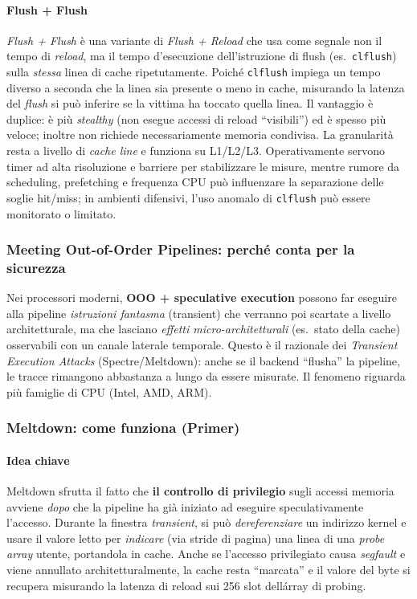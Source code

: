 \paragraph{Flush + Flush}
\emph{Flush + Flush} è una variante di \emph{Flush + Reload} che usa come segnale non il tempo di \emph{reload}, ma il tempo d’esecuzione dell’istruzione di flush (es.\ \texttt{clflush}) sulla \emph{stessa} linea di cache ripetutamente. Poiché \texttt{clflush} impiega un tempo diverso a seconda che la linea sia presente o meno in cache, misurando la latenza del \emph{flush} si può inferire se la vittima ha toccato quella linea. Il vantaggio è duplice: è più \emph{stealthy} (non esegue accessi di reload “visibili”) ed è spesso più veloce; inoltre non richiede necessariamente memoria condivisa. La granularità resta a livello di \emph{cache line} e funziona su L1/L2/L3. Operativamente servono timer ad alta risoluzione e barriere per stabilizzare le misure, mentre rumore da scheduling, prefetching e frequenza CPU può influenzare la separazione delle soglie hit/miss; in ambienti difensivi, l’uso anomalo di \texttt{clflush} può essere monitorato o limitato.


\subsubsection{Meeting Out-of-Order Pipelines: perché conta per la sicurezza}
Nei processori moderni, \textbf{OOO + speculative execution} possono far eseguire alla pipeline \emph{istruzioni fantasma} (transient) che verranno poi scartate a livello architetturale, ma che lasciano \emph{effetti micro-architetturali} (es.\ stato della cache) osservabili con un canale laterale temporale. Questo è il razionale dei \emph{Transient Execution Attacks} (Spectre/Meltdown): anche se il backend “flusha” la pipeline, le tracce rimangono abbastanza a lungo da essere misurate. Il fenomeno riguarda più famiglie di CPU (Intel, AMD, ARM).

\subsubsection{Meltdown: come funziona (Primer)}
\paragraph{Idea chiave}
Meltdown sfrutta il fatto che \textbf{il controllo di privilegio} sugli accessi memoria avviene \emph{dopo} che la pipeline ha già iniziato ad eseguire speculativamente l’accesso. Durante la finestra \emph{transient}, si può \emph{dereferenziare} un indirizzo kernel e usare il valore letto per \emph{indicare} (via stride di pagina) una linea di una \emph{probe array} utente, portandola in cache. Anche se l’accesso privilegiato causa \emph{segfault} e viene annullato architetturalmente, la cache resta “marcata” e il valore del byte si recupera misurando la latenza di reload sui 256 slot dell\'array di probing.


